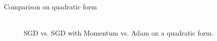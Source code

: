 \documentclass[11pt,compress,t,notes=noshow, xcolor=table]{beamer}
\begin{document}
\begin{vbframe}{Comparison on quadratic form}

\begin{figure}
     \\
    SGD vs. SGD with Momentum vs. Adam on a quadratic form. 
\end{figure} 

\end{vbframe}

\endlecture
\end{document}
